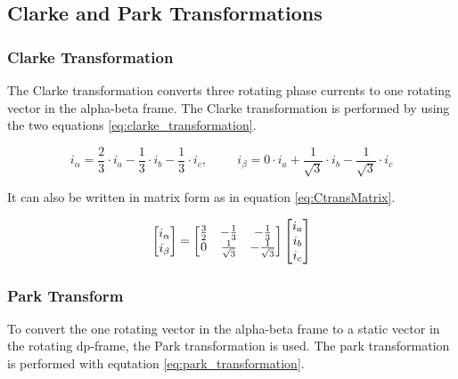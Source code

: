 
\subsection{Clarke and Park Transformations}




\subsubsection{Clarke Transformation}
The Clarke transformation converts three rotating phase currents to one rotating vector in the alpha-beta frame. The Clarke transformation is performed by using the two equations \ref{eq:clarke_transformation}.

\begin{equation}
    i_{\alpha} = \frac{2}{3} \cdot i_a - \frac{1}{3} \cdot i_b - \frac{1}{3} \cdot i_c
    , \hspace{1cm}
    i_{\beta} = 0 \cdot i_a + \frac{1}{\sqrt{3}} \cdot i_b - \frac{1}{\sqrt{3}} \cdot i_c
    \label{eq:clarke_transformation}
\end{equation}

It can also be written in matrix form as in equation \ref{eq:CtransMatrix}. 

\begin{equation}
    \centering
    \begin{bmatrix}
        i_{\alpha} \\ 
        i_{\beta}
    \end{bmatrix}
    =
    \begin{bmatrix}
        \frac{3}{2} & -\frac{1}{3} & -\frac{1}{3} \\
        0 & \frac{1}{\sqrt{3}} & -\frac{1}{\sqrt{3}} \\
    \end{bmatrix}
    \begin{bmatrix}
        i_{a} \\ 
        i_{b} \\ 
        i_{c}
    \end{bmatrix}
    \label{eq:CtransMatrix}
\end{equation}


\subsubsection{Park Transform}
To convert the one rotating vector in the alpha-beta frame to a static vector in the rotating dp-frame, the Park transformation is used. The park transformation is performed with equtation \ref{eq:park_transformation}.

